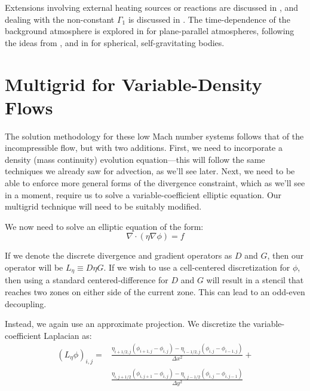 Extensions involving external heating sources or reactions are
discussed in \cite{ABRZ:II,ABNZ:III}, and dealing with the
non-constant $\Gamma_1$ is discussed in \cite{ABRZ:I,KP:2012}.  The
time-dependence of the background atmosphere is explored in
\cite{ABRZ:II} for plane-parallel atmospheres, following the ideas
from \cite{almgren:2000}, and in \cite{multilevel} for spherical,
self-gravitating bodies.

\section{Multigrid for Variable-Density Flows}

The solution methodology for these low Mach number systems follows 
that of the incompressible flow, but with two additions.  First,
we need to incorporate a density (mass continuity) evolution equation---this
will follow the same techniques we already saw for advection, as we'll
see later.
Next, we need to be able to enforce more general forms of the 
divergence constraint, which as we'll see in a moment, require
us to solve a variable-coefficient elliptic equation.  Our
multigrid technique will need to be suitably modified.

\label{sec:lm:vcelliptic}

We now need to solve an elliptic equation of the form:
\begin{equation}
\nabla \cdot (\eta \nabla \phi) = f
\end{equation}

If we denote the discrete divergence and gradient operators as $D$ and $G$,
then our operator will be $L_\eta \equiv D \eta G$.  If we wish to
use a cell-centered discretization for $\phi$, then using a standard 
centered-difference for $D$ and $G$ will result in a stencil that reaches
two zones on either side of the current zone.  This can lead to an
odd-even decoupling. 


Instead, we again use an approximate projection.  We discretize the
variable-coefficient Laplacian as:
\begin{align}
(L_\eta \phi)_{i,j} = 
 & \frac{\eta_{i+1/2,j} (\phi_{i+1,j} - \phi_{i,j}) -
        \eta_{i-1/2,j} (\phi_{i,j} - \phi_{i-1,j})}{\Delta x^2} + \nonumber \\
 & \frac{\eta_{i,j+1/2} (\phi_{i,j+1} - \phi_{i,j}) -
        \eta_{i,j-1/2} (\phi_{i,j} - \phi_{i,j-1})}{\Delta y^2}
\label{lm:eq:lap}
\end{align}

